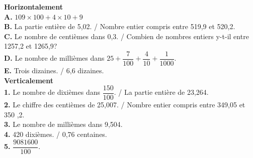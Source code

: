 \documentclass[a4paper,11pt]{article}
\begin{document}
\textbf{Horizontalement}\\

\noindent \textbf{A.}      $109 \times 100 + 4 \times 10 + 9$\\
\textbf{B.}        La partie entière de 5,02. /  Nombre entier compris entre 
519,9 et  520,2.\\
\textbf{C.}      Le nombre de centièmes dans 0,3. / Combien de nombres entiers y-t-il entre 1257,2 et 1265,9?\\
\textbf{D.}       Le nombre de millièmes dans $25 + \dfrac{7}{100} + \dfrac{4}{10} + \dfrac{1}{1000}$.\\
\textbf{E.}      Trois dizaines. /   6,6 dizaines.\\

\textbf{Verticalement}\\

\noindent \textbf{1.}      Le nombre de dixièmes dans $\dfrac{150}{100}$. / La partie entière de 23,264.\\
\textbf{2.}      Le chiffre des centièmes de 25,007. / Nombre entier compris 
entre 349,05 et 350 ,2.\\
\textbf{3.}      Le nombre de millièmes dans 9,504.\\
\textbf{4.}      420 dixièmes. /  0,76 centaines.\\
\textbf{5.}      $\dfrac{9081600}{100}$.\\
\end{document}
